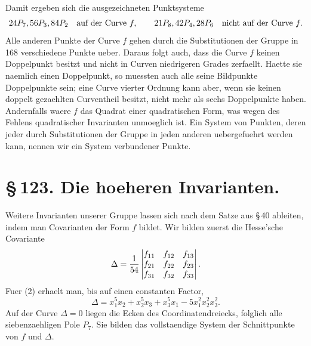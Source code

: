 \documentclass[11pt]{article}
\begin{document}
Damit ergeben sich die ausgezeichneten Punktsysteme
\begin{equation}
24P_7,\\ 56P_3,\\ 84P_2\quad\text{auf der Curve }f,
\qquad
21P_8,\\42P_4,\\28P_6\quad\text{nicht auf der Curve }f.
\end{equation}
Alle anderen Punkte der Curve \(f\) gehen durch die Substitutionen der Gruppe in 168 verschiedene Punkte ueber. Daraus folgt auch, dass die Curve \(f\) keinen Doppelpunkt besitzt und nicht in Curven niedrigeren Grades zerfaellt. Haette sie naemlich einen Doppelpunkt, so muessten auch alle seine Bildpunkte Doppelpunkte sein; eine Curve vierter Ordnung kann aber, wenn sie keinen doppelt gezaehlten Curventheil besitzt, nicht mehr als sechs Doppelpunkte haben. Andernfalls waere \(f\) das Quadrat einer quadratischen Form, was wegen des Fehlens quadratischer Invarianten unmoeglich ist. Ein System von Punkten, deren jeder durch Substitutionen der Gruppe in jeden anderen uebergefuehrt werden kann, nennen wir ein System verbundener Punkte.

\section*{\S\,123. Die hoeheren Invarianten.}

Weitere Invarianten unserer Gruppe lassen sich nach dem Satze aus \S\,40 ableiten, indem man Covarianten der Form \(f\) bildet. Wir bilden zuerst die Hesse'sche Covariante
\begin{equation}
\Delta={1\over54}
\begin{vmatrix}
f_{11}&f_{12}&f_{13}\\
f_{21}&f_{22}&f_{23}\\
f_{31}&f_{32}&f_{33}
\end{vmatrix}.
\end{equation}
Fuer (2) erhaelt man, bis auf einen constanten Factor,
\begin{equation}
\Delta=x_1^5x_2+x_2^5x_3+x_3^5x_1-5x_1^2x_2^2x_3^2.
\tag{3}
\end{equation}
Auf der Curve \(\Delta=0\) liegen die Ecken des Coordinatendreiecks, folglich alle siebenzaehligen Pole \(P_7\). Sie bilden das vollstaendige System der Schnittpunkte von \(f\) und \(\Delta\).
\end{document}
